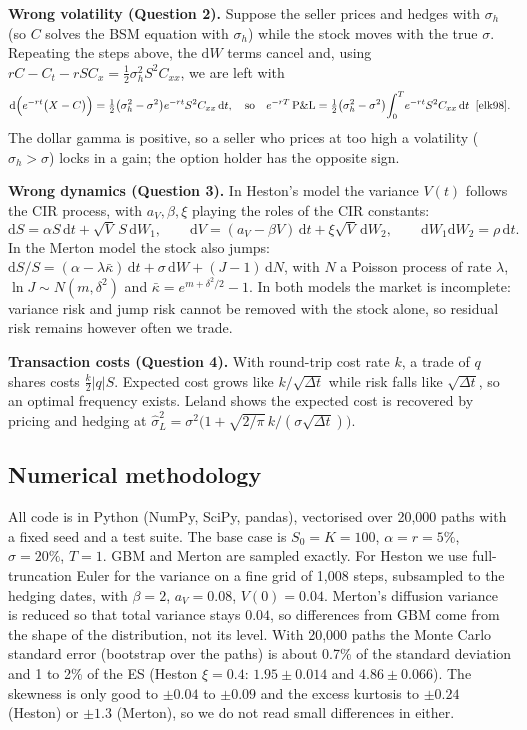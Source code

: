 \documentclass[11pt,a4paper]{article}
\newcommand{\dd}{\,\mathrm{d}}
\begin{document}
\textbf{Wrong volatility (Question 2).} Suppose the seller prices and hedges with $\sigma_h$ (so $C$ solves the BSM equation with $\sigma_h$) while the stock moves with the true $\sigma$. Repeating the steps above, the $\mathrm{d}W$ terms cancel and, using $rC-C_t-rSC_x=\tfrac12\sigma_h^2S^2C_{xx}$, we are left with
\[
\mathrm{d}\Big(e^{-rt}\big(X-C\big)\Big)=\tfrac12\big(\sigma_h^2-\sigma^2\big)e^{-rt}S^2C_{xx}\dd t,
\quad\text{so}\quad
e^{-rT}\,\text{P\&L}=\tfrac12\big(\sigma_h^2-\sigma^2\big)\!\int_0^T\! e^{-rt}S^2C_{xx}\dd t \;\;\text{\cite{elk98}}.
\]
The dollar gamma is positive, so a seller who prices at too high a volatility ($\sigma_h>\sigma$) locks in a gain; the option holder has the opposite sign.

\textbf{Wrong dynamics (Question 3).} In Heston's model \cite{heston93} the variance $V(t)$ follows the CIR process, with $a_V,\beta,\xi$ playing the roles of the CIR constants:
\[
\mathrm{d}S=\alpha S\dd t+\sqrt{V}\,S\dd W_1,\qquad \mathrm{d}V=(a_V-\beta V)\dd t+\xi\sqrt{V}\dd W_2,\qquad \mathrm{d}W_1\mathrm{d}W_2=\rho\dd t .
\]
In the Merton model \cite{merton76} the stock also jumps: $\mathrm{d}S/S=(\alpha-\lambda\bar\kappa)\dd t+\sigma\dd W+(J-1)\dd N$, with $N$ a Poisson process of rate $\lambda$, $\ln J\sim N(m,\delta^2)$ and $\bar\kappa=e^{m+\delta^2/2}-1$. In both models the market is incomplete: variance risk and jump risk cannot be removed with the stock alone, so residual risk remains however often we trade.

\textbf{Transaction costs (Question 4).} With round-trip cost rate $k$, a trade of $q$ shares costs $\tfrac{k}{2}|q|S$. Expected cost grows like $k/\sqrt{\Delta t}$ while risk falls like $\sqrt{\Delta t}$, so an optimal frequency exists. Leland \cite{leland85} shows the expected cost is recovered by pricing and hedging at $\hat\sigma_L^2=\sigma^2\big(1+\sqrt{2/\pi}\,k/(\sigma\sqrt{\Delta t})\big)$.

\subsection{Numerical methodology}

All code is in Python (NumPy, SciPy, pandas), vectorised over 20{,}000 paths with a fixed seed and a test suite. The base case is $S_0=K=100$, $\alpha=r=5\%$, $\sigma=20\%$, $T=1$.
GBM and Merton are sampled exactly. For Heston we use full-truncation Euler for the variance \cite{lord10} on a fine grid of 1{,}008 steps, subsampled to the hedging dates, with $\beta=2$, $a_V=0.08$, $V(0)=0.04$. Merton's diffusion variance is reduced so that total variance stays $0.04$, so differences from GBM come from the shape of the distribution, not its level. With 20{,}000 paths the Monte Carlo standard error (bootstrap over the paths) is about 0.7\% of the standard deviation and 1 to 2\% of the ES (Heston $\xi=0.4$: $1.95\pm0.014$ and $4.86\pm0.066$). The skewness is only good to $\pm0.04$ to $\pm0.09$ and the excess kurtosis to $\pm0.24$ (Heston) or $\pm1.3$ (Merton), so we do not read small differences in either.
\end{document}
